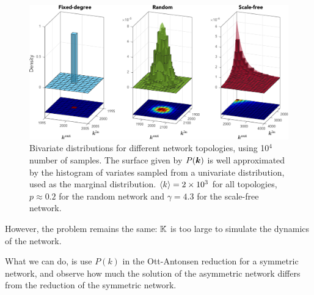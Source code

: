 \begin{figure}[ht]
\centering
\includegraphics[width = \textwidth]{../Figures/Distributions/2D.pdf}
\caption{Bivariate distributions for different network topologies, using 10$^4$ number of samples. The surface given by $P({\boldsymbol{k}})$ is well approximated by the histogram of variates sampled from a univariate distribution, used as the marginal distribution. ${\langle k\rangle} =  2 \times 10^3$ for all topologies, $p \approx 0.2$ for the random network and $\gamma = 4.3$ for the scale-free network.}
\label{fig:2Ddistributions}
\end{figure}
However, the problem remains the same: ${\mathbb{K}}$ is too large to simulate the dynamics of the network. 

What we can do, is use $P(k)$ in the Ott-Antonsen reduction for a symmetric network, and observe how much the solution of the asymmetric network differs from the reduction of the symmetric network.

